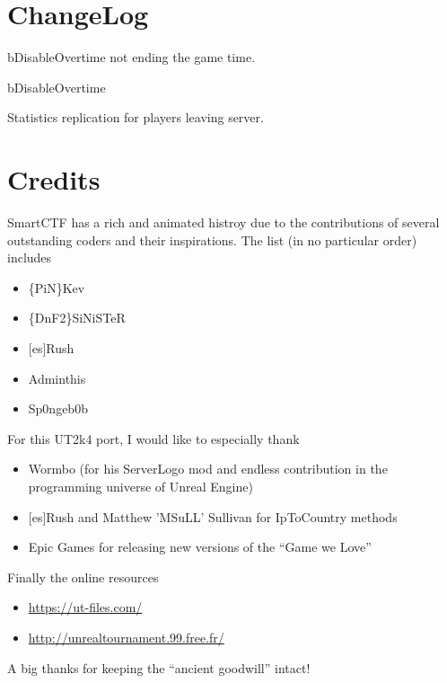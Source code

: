 \documentclass{article}
\begin{document}
\section{ChangeLog}
\begin{changelog}[author=The\_Cowboy,
                  sectioncmd=\subsection,
                  title=SmartCTF changelog]
\begin{version}[v=1C(Unreleased), date=2020-06-19]
\fixed
     \item bDisableOvertime not ending the game time.
\end{version}
\begin{version}[v=1B, date=2020-06-10]
\added
     \item bDisableOvertime
\fixed
     \item Statistics replication for players leaving server.
\end{version}
\end{changelog}


\section{Credits}
SmartCTF has a rich and animated histroy due to the contributions of several outstanding coders and their inspirations.  The list (in no particular order) includes
\begin{itemize}
\item \{PiN\}Kev
\item \{DnF2\}SiNiSTeR
\item {[es]}Rush
\item Adminthis
\item Sp0ngeb0b 
\end{itemize}

For this UT2k4 port, I would like to especially thank
\begin{itemize}
\item Wormbo (for his ServerLogo mod and endless contribution in the programming universe of Unreal Engine)
\item {[es]}Rush and Matthew 'MSuLL' Sullivan for IpToCountry methods
\item Epic Games for releasing new versions of the ``Game we Love''
\end{itemize}

Finally the online resources
\begin{itemize}
\item \href{https://ut-files.com/}{{\color{Blue}https://ut-files.com/}}
\item \href{http://unrealtournament.99.free.fr/}{{\color{Blue}http://unrealtournament.99.free.fr/}}
\end{itemize}
A big thanks for keeping the ``ancient goodwill'' intact!
\end{document}
